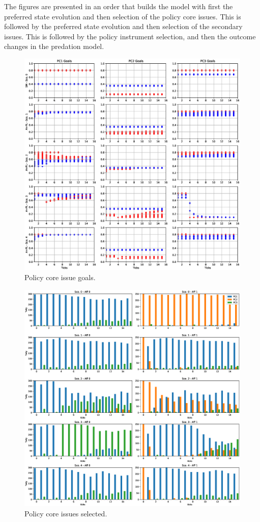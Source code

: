 \documentclass[12pt]{article}
\begin{document}
The figures are presented in an order that builds the model with first the preferred state evolution and then selection of the policy core issues. This is followed by the preferred state evolution and then selection of the secondary issues. This is followed by the policy instrument selection, and then the outcome changes in the predation model.

\begin{figure}
\centering
\includegraphics[width = 0.95\linewidth, angle = 0]{figures/PE_PL_PCGoals}
\caption{Policy core issue goals.}
\label{fig:PE_PL_PCGoals}
\end{figure}

\begin{figure}
\centering
\includegraphics[width = 0.95\linewidth, angle = 0]{figures/PE_PL_PCSelected}
\caption{Policy core issues selected.}
\label{fig:PE_PL_PCSelected}
\end{figure}
\end{document}
